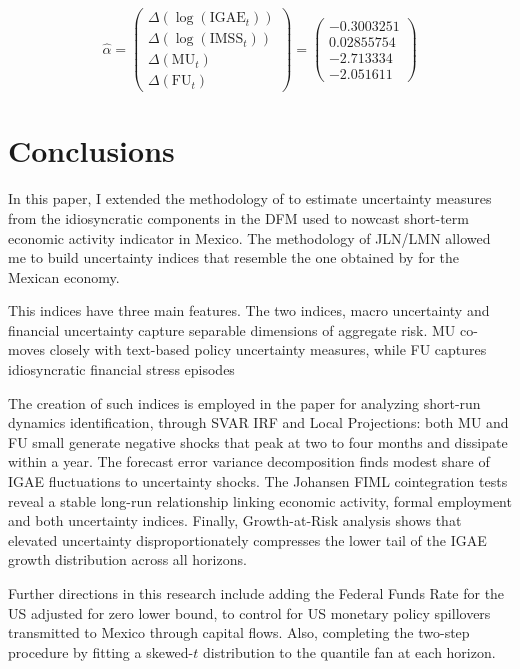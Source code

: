 \documentclass[12pt]{article}
\begin{document}
\[
\hat{\alpha} = 
\begin{pmatrix}
\Delta(\log(\text{IGAE}_t)) \\
\Delta(\log(\text{IMSS}_t)) \\
\Delta(\text{MU}_t) \\
\Delta(\text{FU}_t)
\end{pmatrix} 
= 
\begin{pmatrix}
-0.3003251 \\0.02855754 \\-2.713334 \\-2.051611
\end{pmatrix}
\]

\section{Conclusions}\label{sec:conclusions}

In this paper, I extended the methodology of \cite{corona2022timely} to estimate uncertainty measures from the idiosyncratic components in the DFM used to nowcast short-term economic activity indicator in Mexico. The methodology of JLN/LMN allowed me to build uncertainty indices that resemble the one obtained by \cite{baker2016measuring} for the Mexican economy. 

This indices have three main features. The two indices, macro uncertainty and financial uncertainty capture separable dimensions of aggregate risk. MU co-moves closely with text-based policy uncertainty measures, while FU captures idiosyncratic financial stress episodes 

The creation of such indices is employed in the paper for analyzing short-run dynamics identification, through SVAR IRF and Local Projections: both MU and FU small generate negative shocks that peak at two to four months and dissipate within a year. The forecast error variance decomposition finds modest share of IGAE fluctuations to uncertainty shocks. The Johansen FIML cointegration tests reveal a stable long-run relationship linking economic activity, formal employment and both uncertainty indices. Finally, Growth-at-Risk analysis shows that elevated uncertainty disproportionately compresses the lower tail of the IGAE growth distribution across all horizons.

Further directions in this research include adding the Federal Funds Rate for the US adjusted for zero lower bound, to control for US monetary policy 
spillovers transmitted to Mexico through capital flows. Also, completing the 
two-step \citet{adrian2019vulnerable} procedure by fitting a skewed-$t$ 
distribution to the quantile fan at each horizon.
\end{document}
